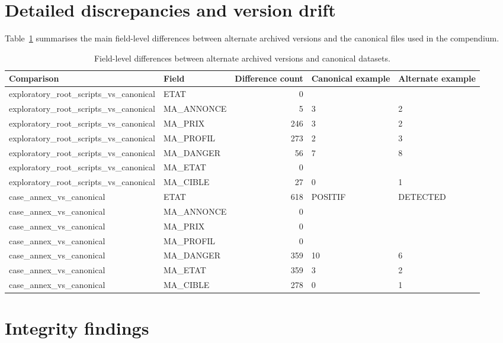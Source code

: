 \documentclass[11pt,a4paper]{article}
\begin{document}
\section{Detailed discrepancies and version drift}
Table~\ref{tab:diffs} summarises the main field-level differences between alternate archived versions and the canonical files used in the compendium.

\begin{landscape}
\begin{table}[H]
\centering
\caption{Field-level differences between alternate archived versions and canonical datasets.}
\label{tab:diffs}
\scriptsize
\begin{tabularx}{\linewidth}{p{15cm} p{2.3cm} r p{3.0cm} X}
\toprule
Comparison & Field & Difference count & Canonical example & Alternate example \\
\midrule
exploratory\_root\_scripts\_vs\_canonical & ETAT & 0 &  &  \\
exploratory\_root\_scripts\_vs\_canonical & MA\_ANNONCE & 5 & 3 & 2 \\
exploratory\_root\_scripts\_vs\_canonical & MA\_PRIX & 246 & 3 & 2 \\
exploratory\_root\_scripts\_vs\_canonical & MA\_PROFIL & 273 & 2 & 3 \\
exploratory\_root\_scripts\_vs\_canonical & MA\_DANGER & 56 & 7 & 8 \\
exploratory\_root\_scripts\_vs\_canonical & MA\_ETAT & 0 &  &  \\
exploratory\_root\_scripts\_vs\_canonical & MA\_CIBLE & 27 & 0 & 1 \\
case\_annex\_vs\_canonical & ETAT & 618 & POSITIF & DETECTED \\
case\_annex\_vs\_canonical & MA\_ANNONCE & 0 &  &  \\
case\_annex\_vs\_canonical & MA\_PRIX & 0 &  &  \\
case\_annex\_vs\_canonical & MA\_PROFIL & 0 &  &  \\
case\_annex\_vs\_canonical & MA\_DANGER & 359 & 10 & 6 \\
case\_annex\_vs\_canonical & MA\_ETAT & 359 & 3 & 2 \\
case\_annex\_vs\_canonical & MA\_CIBLE & 278 & 0 & 1 \\
\bottomrule
\end{tabularx}
\end{table}
\end{landscape}

\section{Integrity findings}
\end{document}
